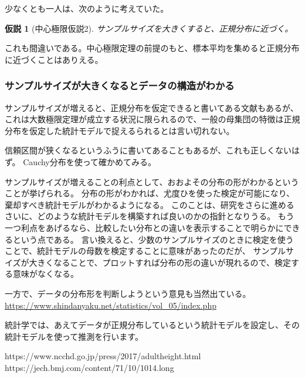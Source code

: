 \documentclass[a4paper,11pt,dvipdfmx]{jsarticle}
\newtheorem{hypoth}{仮説}[section]
\begin{document}
少なくとも一人は、次のように考えていた。
\begin{hypoth}[中心極限仮説2]
    サンプルサイズを大きくすると、正規分布に近づく。
\end{hypoth}
これも間違いである。中心極限定理の前提のもと、標本平均を集めると正規分布に近づくことはありえる。



\subsubsection{ サンプルサイズが大きくなるとデータの構造がわかる}
サンプルサイズが増えると、正規分布を仮定できると書いてある文献もあるが、これは大数極限定理が成立する状況に限られるので、一般の母集団の特徴は正規分布を仮定した統計モデルで捉えるられるとは言い切れない。

信頼区間が狭くなるというふうに書いてあることもあるが、これも正しくないはず。
Cauchy分布を使って確かめてみる。
\fi 

サンプルサイズが増えることの利点として、おおよその分布の形がわかるということが挙げられる。
分布の形がわかれば、尤度ひを使った検定が可能になり、棄却すべき統計モデルがわかるようになる。
このことは、研究をさらに進めるさいに、どのような統計モデルを構築すれば良いのかの指針となりうる。
もう一つ利点をあげるなら、比較したい分布との違いを表示することで明らかにできるという点である。
言い換えると、少数のサンプルサイズのときに検定を使うことで、統計モデルの母数を検定することに意味があったのだが、
サンプルサイズが大きくなることで、プロットすれば分布の形の違いが現れるので、検定する意味がなくなる。




一方で、データの分布形を判断しようという意見も当然出ている。
\url{https://www.shindanyaku.net/statistics/vol_05/index.php}
\fi 

統計学では、あえてデータが正規分布しているという統計モデルを設定し、その統計モデルを使って推測を行います。

https://www.ncchd.go.jp/press/2017/adultheight.html
https://jech.bmj.com/content/71/10/1014.long

\fi 



\end{document}
